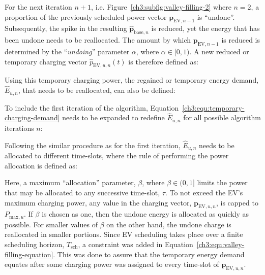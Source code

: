 For the next iteration $n+1$, i.e. Figure~\ref{ch3:subfig:valley-filling-2} where $n=2$, a proportion of the previously scheduled power vector $\textbf{p}_{\text{EV},n-1}$ is ``undone''.
Subsequently, the spike in the resulting $\hat{\textbf{p}}_{\text{base}, n}$ is reduced, yet the energy that has been undone needs to be reallocated.
The amount by which $\textbf{p}_{\text{EV},n-1}$ is reduced is determined by the ``\textit{undoing}'' parameter $\alpha$, where $\alpha \in [0, 1)$.
A new reduced or temporary charging vector $\hat{p}_{\text{EV}, u, n}(t)$ is therefore defined as:



Using this temporary charging power, the regained or temporary energy demand, $\hat{E}_{u,n}$, that needs to be reallocated, can also be defined:



To include the first iteration of the algorithm, Equation~\ref{ch3:equ:temporary-charging-demand} needs to be expanded to redefine $\hat{E}_{u,n}$ for all possible algorithm iterations $n$:



Following the similar procedure as for the first iteration, $\hat{E}_{u,n}$ needs to be allocated to different time-slots, where the rule of performing the power allocation is defined as:



\nomenclature[K]{$\beta$}{Allocation parameter to assign a portion of the temporary energy demand, $\hat{E}_{u,n}$, where $\beta \in (0, 1]$ (Chapter \ref{ch3})}

Here, a maximum ``allocation'' parameter, $\beta$, where $\beta \in (0, 1]$ limits the power that may be allocated to any successive time-slot, $\tau$.
To not exceed the EV's maximum charging power, any value in the charging vector, $\textbf{p}_{\text{EV},u,n}$, is capped to $P_{\text{max},u}$.
If $\beta$ is chosen as one, then the undone energy is allocated as quickly as possible.
For smaller values of $\beta$ on the other hand, the undone charge is reallocated in smaller portions.
Since EV scheduling takes place over a finite scheduling horizon, $T_\text{sch}$, a constraint was added in Equation~\ref{ch3:equ:valley-filling-equation}.
This was done to assure that the temporary energy demand equates after some charging power was assigned to every time-slot of $\textbf{p}_{\text{EV},u,n}$.

